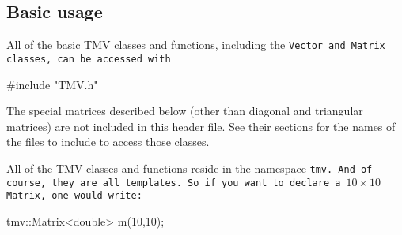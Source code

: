 \begin{enumerate}
\begin{comment}
\item
\textbf{Comments}

The code is highly commented, especially for the more complicated algorithms.
I have this egotistical quirk that I need to understand all of the code I write.
So none of the algorithms are just taken verbatim from LAPACK or anything like that.
I force myself to understand the algorithm (usually from Golub and van Loan,
but sometimes from a journal article or something I find on the net),
write a long comment explaining how it works, and then finally write the code
from scratch.  Then I usually compare my code to the LAPACK version, at which point
I have occasionally found ways to either speed it up or make it more accurate
(which also get commented, of course).

But the point is - if you want to understand how, say, the blocked Bunch-Kaufman
algorithm works, you'll probably do better looking at the comment in the 
TMV code than trying to decipher the LAPACK routines.  Plus, the code itself is
usually a lot more readable, since the arithmetic is written with the operator
overloads and such rather than the cryptic BLAS function names.
\end{comment}

\end{enumerate}

\subsection{Basic usage}

All of the basic TMV classes and functions, including the \tt{Vector} and \tt{Matrix} 
classes, can be accessed with
\begin{tmvcode}
#include "TMV.h"
\end{tmvcode}
The special matrices described below (other than diagonal and triangular matrices) 
are not included in this header file.
See their sections for the names
of the files to include to access those classes.

All of the TMV classes and functions reside in the namespace \tt{tmv}. 
And of course, they are all templates.
So if you want to declare a $10 \times 10$ \tt{Matrix}, one would write:
\begin{tmvcode}
tmv::Matrix<double> m(10,10);
\end{tmvcode}

